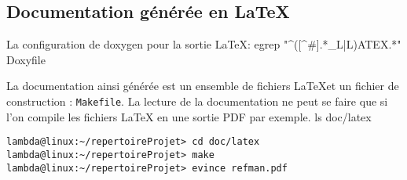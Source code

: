 \documentclass[12pt,a4paper,oneside,titlepage,final]{article}
\begin{document}
\subsection{Documentation générée en \LaTeX}
\label{annexe:latexOutputDoc}
La configuration de \gls{doxygen} pour la sortie \LaTeX :
\bash[stdout]
egrep "^([^#].*_L|L)ATEX.*" Doxyfile
\END

La documentation ainsi générée est un ensemble de fichiers \LaTeX et
un fichier de construction : \lstinline{Makefile}. La lecture de la
documentation ne peut se faire que si l'on compile les fichiers \LaTeX
en une sortie PDF par exemple.
\bash[stdout]
ls doc/latex
\END

\begin{lstlisting}[style=groolotScript]
lambda@linux:~/repertoireProjet> cd doc/latex
lambda@linux:~/repertoireProjet> make
lambda@linux:~/repertoireProjet> evince refman.pdf
\end{lstlisting}



\newpage \printbibheading
\printbibliography[nottype=online,check=notonline,heading=subbibliography,title={Bibliographiques}]
\printbibliography[check=online,heading=subbibliography,title={Webographiques}]

\printglossaries
\end{document}

